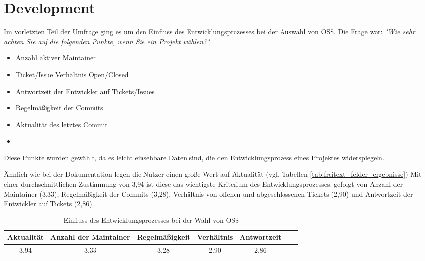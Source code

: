 \section{Development}

Im vorletzten Teil der Umfrage ging es um den Einfluss des Entwicklungsprozesses bei der Auswahl von
OSS. Die Frage war: \textit{"Wie sehr achten Sie auf die folgenden Punkte, wenn Sie ein Projekt
    wählen?"}

\begin{multicols}{2}
    \begin{itemize}
        \setlength\itemsep{0em}
        \item Anzahl aktiver Maintainer
        \item Ticket/Issue Verhältnis Open/Closed
        \item Antwortzeit der Entwickler auf Tickets/Issues
        \item Regelmäßigkeit der Commits
        \item Aktualität des letztes Commit
        \item []
    \end{itemize}
\end{multicols}

\noindent
Diese Punkte wurden gewählt, da es leicht einsehbare Daten sind, die den Entwicklungsprozess eines 
Projektes widerspiegeln.

Ähnlich wie bei der Dokumentation legen die Nutzer einen große Wert auf Aktualität 
(vgl. Tabellen \ref{tab:freitext_felder_ergebnisse})
Mit einer durchschnittlichen Zustimmung von 3,94 ist diese das wichtigste Kriterium des 
Entwicklungsprozesses, gefolgt von Anzahl der Maintainer (3,33), Regelmäßigkeit der Commits (3,28),
Verhältnis von offenen und abgeschlossenen Tickets (2,90) und Antwortzeit der Entwickler auf Tickets
(2,86).


\begin{table}[ht]
    \begin{tabular}{ccccccc}
        \hline
        Aktualität & Anzahl der Maintainer & Regelmäßigkeit & Verhältnis & Antwortzeit \\ \hline
        3.94       & 3.33                  & 3.28           & 2.90       & 2.86
    \end{tabular}%
    \caption{Einfluss des Entwicklungsprozesses bei der Wahl von OSS}
    \label{tab:development}
\end{table}

